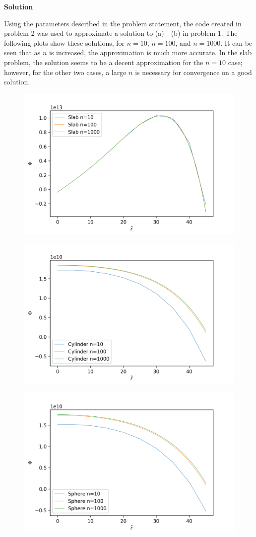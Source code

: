 \documentclass{amsart}
\theoremstyle{definition}
\begin{document}
\bigbreak
\textbf{Solution}

Using the parameters described in the problem statement, the code created in problem 2 was used to approximate a solution to (a) - (b) in problem 1.
The following plots show these solutions, for $n=10$, $n=100$, and $n=1000$.
It can be seen that as $n$ is increased, the approximation is much more accurate.
In the slab problem, the solution seems to be a decent approximation for the $n=10$ case; however, for the other two cases, a large $n$ is necessary for convergence on a good solution.


\begin{figure}[h!]
    \includegraphics[width=.7\linewidth]{slab}
\end{figure}

\begin{figure}[h!]
    \includegraphics[width=.7\linewidth]{cyl}
\end{figure}

\begin{figure}[h!]
    \includegraphics[width=.7\linewidth]{sph}
\end{figure}
\end{document}

